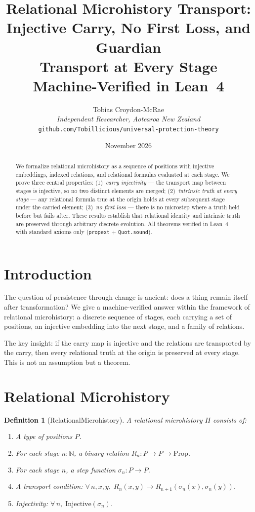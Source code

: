 \documentclass[12pt,a4paper]{article}
\title{Relational Microhistory Transport:\\[0.3em]
Injective Carry, No First Loss, and Guardian\\
Transport at Every Stage\\[0.5em]
\large Machine-Verified in Lean~4}
\author{Tobias Croydon-McRae\\
\textit{Independent Researcher, Aotearoa New Zealand}\\
\texttt{github.com/Tobillicious/universal-protection-theory}}
\date{November 2026}
\newtheorem{definition}[theorem]{Definition}
\begin{document}
\maketitle

\begin{abstract}
We formalize relational microhistory as a sequence of positions with
injective embeddings, indexed relations, and relational formulas evaluated
at each stage. We prove three central properties: (1)~\emph{carry injectivity}
--- the transport map between stages is injective, so no two distinct
elements are merged; (2)~\emph{intrinsic truth at every stage} --- any
relational formula true at the origin holds at every subsequent stage under
the carried element; (3)~\emph{no first loss} --- there is no microstep
where a truth held before but fails after. These results establish that
relational identity and intrinsic truth are preserved through arbitrary
discrete evolution. All theorems verified in Lean~4 with standard axioms
only (\texttt{propext} + \texttt{Quot.sound}).
\end{abstract}

\section{Introduction}

The question of persistence through change is ancient: does a thing remain
itself after transformation? We give a machine-verified answer within the
framework of relational microhistory: a discrete sequence of stages, each
carrying a set of positions, an injective embedding into the next stage,
and a family of relations.

The key insight: if the carry map is injective and the relations are
transported by the carry, then every relational truth at the origin is
preserved at every stage. This is not an assumption but a theorem.

\section{Relational Microhistory}

\begin{definition}[RelationalMicrohistory]
A relational microhistory $H$ consists of:
\begin{enumerate}
    \item A type of positions $P$.
    \item For each stage $n : \mathbb{N}$, a binary relation $R_n : P \to P \to \text{Prop}$.
    \item For each stage $n$, a step function $\sigma_n : P \to P$.
    \item A transport condition: $\forall\, n, x, y,\; R_n(x, y) \to R_{n+1}(\sigma_n(x), \sigma_n(y))$.
    \item Injectivity: $\forall\, n,\; \text{Injective}(\sigma_n)$.
\end{enumerate}
\end{definition}
\end{document}
